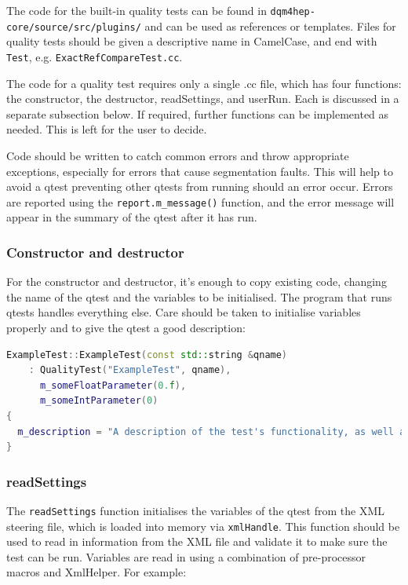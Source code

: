 The code for the built-in quality tests can be found in \texttt{dqm4hep-core/source/src/plugins/} and can be used as references or templates. Files for quality tests should be given a descriptive name in CamelCase, and end with \texttt{Test}, e.g. \texttt{ExactRefCompareTest.cc}.

The code for a quality test requires only a single .cc file, which has four functions: the constructor, the destructor, readSettings, and userRun. Each is discussed in a separate subsection below. If required, further functions can be implemented as needed. This is left for the user to decide.

Code should be written to catch common errors and throw appropriate exceptions, especially for errors that cause segmentation faults. This will help to avoid a \acrshort{qtest} preventing other \acrshort{qtest}s from running should an error occur. Errors are reported using the \texttt{report.m\_message()} function, and the error message will appear in the summary of the \acrshort{qtest} after it has run.

\subsubsection{Constructor and destructor}
For the constructor and destructor, it's enough to copy existing code, changing the name of the \acrshort{qtest} and the variables to be initialised. The program that runs \acrshort{qtest}s handles everything else. Care should be taken to initialise variables properly and to give the \acrshort{qtest} a good description:

\begin{lstlisting}[language=C++]
ExampleTest::ExampleTest(const std::string &qname)
    : QualityTest("ExampleTest", qname),
      m_someFloatParameter(0.f),
      m_someIntParameter(0)
{
  m_description = "A description of the test's functionality, as well as the meaning of the quality statistic it outputs.";
}
\end{lstlisting}

\subsubsection{readSettings}
The \texttt{readSettings} function initialises the variables of the \acrshort{qtest} from the \acrshort{XML} steering file, which is loaded into memory via \texttt{xmlHandle}. This function should be used to read in information from the \acrshort{XML} file and validate it to make sure the test can be run. Variables are read in using a combination of pre-processor macros and XmlHelper. For example:

